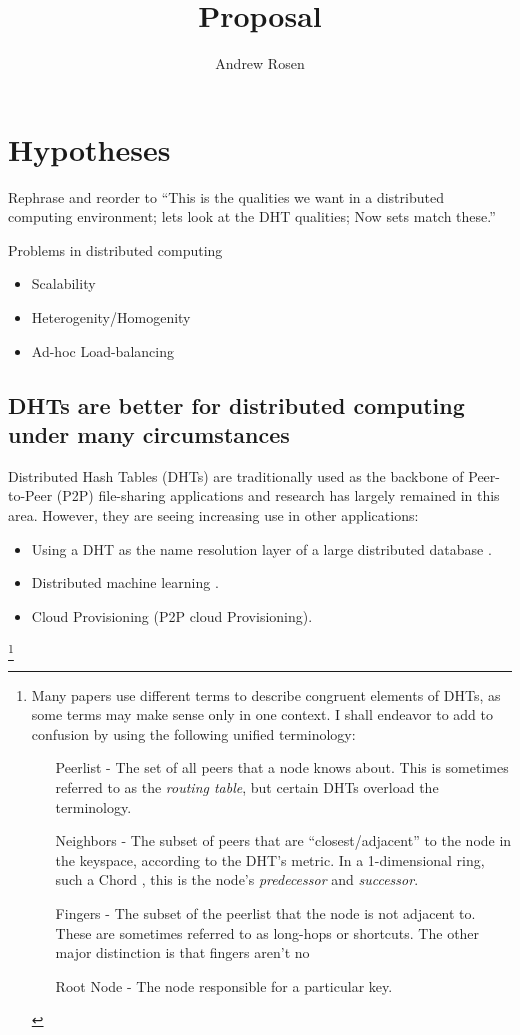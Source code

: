 \documentclass[10pt,letterpaper]{report}
\title{Proposal}
\author{Andrew Rosen}
\begin{document}
\maketitle
\setcounter{tocdepth}{4}
\tableofcontents
\newpage
\chapter{Hypotheses}

Rephrase and reorder to ``This is the qualities we want in a distributed computing environment; lets look at the DHT qualities;  Now sets match these.''


Problems in distributed computing
\begin{itemize}
	\item Scalability
	\item Heterogenity/Homogenity
	\item Ad-hoc Load-balancing
\end{itemize}


\section{DHTs are better for distributed computing under many circumstances}
Distributed Hash Tables (DHTs) are traditionally used as the backbone of Peer-to-Peer (P2P) file-sharing applications and research has largely remained in this area.
However, they are seeing increasing use in other applications:

\begin{itemize}
    \item Using a DHT as the name resolution layer of a large distributed database \cite{Mateescu2011440}. %
    \item Distributed machine learning \cite{liparameter}.
    \item Cloud Provisioning  (P2P cloud Provisioning).
\end{itemize}



\footnote{
Many papers use different terms to describe congruent elements of DHTs, as some terms may make sense only in one context.
I shall endeavor to add to confusion by using the following unified terminology:
\begin{enumerate}
    \item[Peerlist] -  The set of all peers that a node knows about.  This is sometimes referred to as the \textit{routing table}, but certain DHTs \cite{tapestry} \cite{pastry} overload the terminology.
    \item[Neighbors] - The subset of peers that are ``closest/adjacent'' to the node in the keyspace, according to the DHT's metric.  In a 1-dimensional ring, such a Chord \cite{chord}, this is the node's \textit{predecessor} and \textit{successor}.
    \item[Fingers] - The subset of the peerlist that the node is not adjacent to.  These are sometimes referred to as long-hops or shortcuts. The other major distinction is that fingers aren't no
    \item[Root Node] - The node responsible for a particular key. 
\end{enumerate}
}
\end{document}
